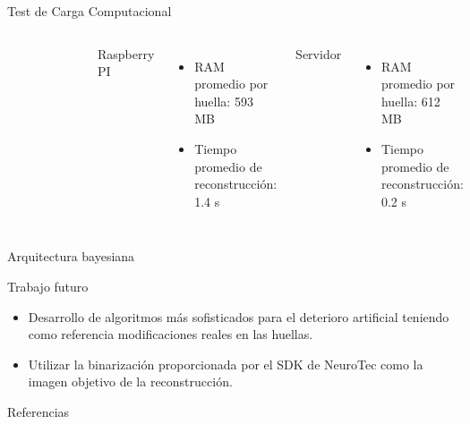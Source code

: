 \documentclass[12pt,aspectratio=169]{beamer}
\begin{document}
\begin{frame}{Test de Carga Computacional}
\begin{columns}[c]
\begin{figure}
            \end{figure}
            Raspberry PI\\
            \begin{itemize}
            \item RAM promedio por huella: 593 MB
            \item Tiempo promedio de reconstrucción: 1.4 s
            \end{itemize}
            Servidor\\
            \begin{itemize}
            \item RAM promedio por huella: 612 MB
            \item Tiempo promedio de reconstrucción: 0.2 s
            \end{itemize}
    \end{columns}

\end{frame}

\begin{frame}{Arquitectura bayesiana}
    
\end{frame}

\begin{frame}{Trabajo futuro}

    \begin{itemize}
        \setlength\itemsep{5mm}
        \item Desarrollo de algoritmos más sofisticados para el deterioro artificial teniendo como referencia modificaciones reales en las huellas.
        \item Utilizar la binarización proporcionada por el SDK de NeuroTec como la imagen objetivo de la reconstrucción.
    \end{itemize}

\end{frame}

\nocite{*}
\begin{frame}[allowframebreaks]{Referencias}


\end{frame}
\end{document}

